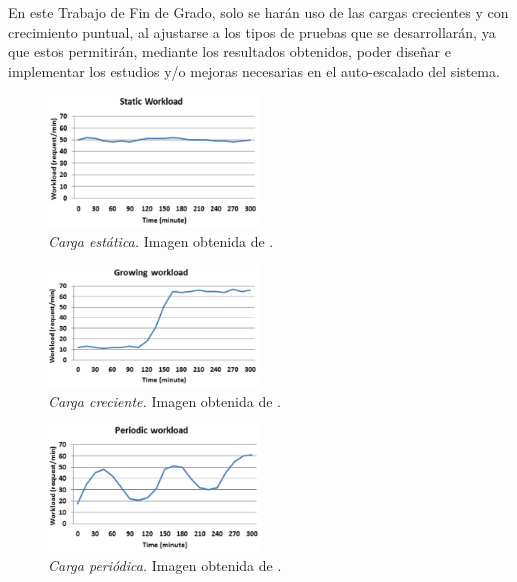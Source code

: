 En este Trabajo de Fin de Grado, solo se harán uso de las cargas crecientes y 
con crecimiento puntual, al ajustarse a los tipos de pruebas que se desarrollarán, ya 
que estos permitirán, mediante los resultados obtenidos, poder diseñar e implementar
los estudios y/o mejoras necesarias en el auto-escalado del sistema.

\begin{figure}[htpb]
    \centering
    \includegraphics[width=0.5\textwidth]{images/types-of-workload/static-workload.png}
    \caption{\textit{Carga estática.} Imagen obtenida de \cite{paper:type_of_workloads}.}
    \label{fig:art_workloads-static}
\end{figure}

\begin{figure}[htpb]
    \centering
    \includegraphics[width=0.5\textwidth]{images/types-of-workload/inc-workload.png}
    \caption{\textit{Carga creciente.} Imagen obtenida de \cite{paper:type_of_workloads}.}
    \label{fig:art_workloads-inc}
\end{figure}

\begin{figure}[htpb]
    \centering
    \includegraphics[width=0.5\textwidth]{images/types-of-workload/periodic-workload.png}
    \caption{\textit{Carga periódica.} Imagen obtenida de \cite{paper:type_of_workloads}.}
    \label{fig:art_workloads-periodic}
\end{figure}

